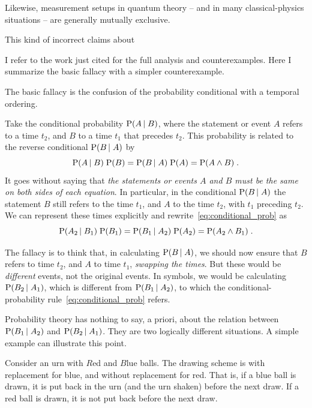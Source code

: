 \documentclass[\ifafour a4paper,12pt,\else a5paper,10pt,\fi%
onecolumn,oneside,article,%
british%
]{memoir}
\theoremstyle{remark}
\theoremstyle{innote}
\newcommand*{\p}{\mathrm{P}}%
\renewcommand*{\|}[1][]{\nonscript\,#1\vert\nonscript\;\mathopen{}}
\begin{document}
Likewise, measurement setups
in quantum theory -- and in many classical-physics situations -- are
generally mutually exclusive.

This kind of incorrect claims about

I refer to the work just cited for the full analysis and counterexamples.
Here I summarize the basic fallacy with a simpler counterexample.

\medskip

The basic fallacy is the confusion of the probability conditional with a
temporal ordering.

Take the conditional probability $\p(A \| B)$, where the statement or event
$A$ refers to a time $t_{2}$, and $B$ to a time $t_{1}$ that precedes
$t_{2}$. This probability is related to the reverse conditional
$\p(B \| A)$ by
\begin{equation}
  \label{eq:conditional_prob}
  \p(A \| B)\; \p(B) = \p(B \| A) \; \p(A) = \p(A \land B) \;.
\end{equation}
It goes without saying that \emph{the statements or events $A$ and $B$ must
  be the same on both sides of each equation}. In particular, in the
conditional $\p(B \| A)$ the statement $B$ still refers to the time
$t_{1}$, and $A$ to the time $t_{2}$, with $t_{1}$ preceding $t_{2}$. We
can represent these times explicitly and
rewrite~\eqref{eq:conditional_prob} as
\begin{equation}
  \label{eq:conditional_prob_time}
  \p(A_{2} \| B_{1})\; \p(B_{1}) = \p(B_{1} \| A_{2}) \; \p(A_{2})
  = \p(A_{2} \land B_{1}) \;.
\end{equation}

The fallacy is to think that, in calculating $\p(B \| A)$, we should now
ensure that $B$ refers to time $t_{2}$, and $A$ to time $t_{1}$, \emph{swapping
the times}. But these would be \emph{different} events, not the original
events. In symbols, we would be calculating $\p(B_{2} \| A_{1})$, which is
different from $\p(B_{1} \| A_{2})$, to which the conditional-probability
rule~\eqref{eq:conditional_prob} refers.

Probability theory has nothing to say, a priori, about the relation between
$\p(B_{1} \| A_{2})$ and $\p(B_{2} \| A_{1})$. They are two logically
different situations. A simple example can illustrate this point.

Consider an urn with $R$ed and $B$lue balls. The drawing scheme is with
replacement for blue, and without replacement for red. That is, if a blue
ball is drawn, it is put back in the urn (and the urn shaken) before the
next draw. If a red ball is drawn, it is not put back before the next draw.
\end{document}
